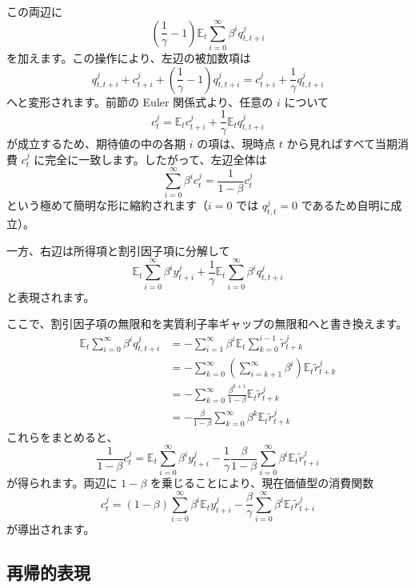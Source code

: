 \documentclass[
  japanese,
  lualatex,
  ja=standard,
  12pt,
  a4paper]{ltjsarticle}
\begin{document}

この両辺に \[
\left( \frac{1}{\gamma} - 1 \right) \mathbb{E}_t \sum_{i=0}^{\infty} \beta^i q_{t,t+i}^j
\] を加えます。この操作により、左辺の被加数項は \[
q_{t,t+i}^j + c_{t+i}^j + \left( \frac{1}{\gamma} - 1 \right) q_{t,t+i}^j = c_{t+i}^j + \frac{1}{\gamma} q_{t,t+i}^j
\] へと変形されます。前節の Euler 関係式より、任意の \(i\) について \[
c_t^j = \mathbb{E}_t c_{t+i}^j + \frac{1}{\gamma} \mathbb{E}_t q_{t,t+i}^j
\] が成立するため、期待値の中の各期 \(i\) の項は、現時点 \(t\)
から見ればすべて当期消費 \(c_t^j\)
に完全に一致します。したがって、左辺全体は \[
\sum_{i=0}^{\infty} \beta^i c_t^j = \frac{1}{1-\beta} c_t^j
\] という極めて簡明な形に縮約されます（\(i=0\) では \(q_{t,t}^j=0\)
であるため自明に成立）。

一方、右辺は所得項と割引因子項に分解して \[
\mathbb{E}_t \sum_{i=0}^{\infty} \beta^i y_{t+i}^j
+
\frac{1}{\gamma} \mathbb{E}_t \sum_{i=0}^{\infty} \beta^i q_{t,t+i}^j
\] と表現されます。

ここで、割引因子項の無限和を実質利子率ギャップの無限和へと書き換えます。
\[
\begin{aligned}
\mathbb{E}_t \sum_{i=0}^{\infty} \beta^i q_{t,t+i}^j
&=
- \sum_{i=1}^{\infty} \beta^i \mathbb{E}_t \sum_{k=0}^{i-1} \widetilde{r}_{t+k}^j
\\
&=
- \sum_{k=0}^{\infty} \left( \sum_{i=k+1}^{\infty} \beta^i \right) \mathbb{E}_t \widetilde{r}_{t+k}^j
\\
&=
- \sum_{k=0}^{\infty} \frac{\beta^{k+1}}{1-\beta} \mathbb{E}_t \widetilde{r}_{t+k}^j
\\
&=
- \frac{\beta}{1-\beta} \sum_{k=0}^{\infty} \beta^k \mathbb{E}_t \widetilde{r}_{t+k}^j
\end{aligned}
\] これらをまとめると、 \[
\frac{1}{1-\beta} c_t^j
=
\mathbb{E}_t \sum_{i=0}^{\infty} \beta^i y_{t+i}^j
-
\frac{1}{\gamma} \frac{\beta}{1-\beta} \sum_{i=0}^{\infty} \beta^i \mathbb{E}_t \widetilde{r}_{t+i}^j
\] が得られます。両辺に \(1-\beta\)
を乗じることにより、現在価値型の消費関数 \[
c_t^j
=
(1-\beta) \sum_{i=0}^{\infty} \beta^i \mathbb{E}_t y_{t+i}^j
-
\frac{\beta}{\gamma} \sum_{i=0}^{\infty} \beta^i \mathbb{E}_t \widetilde{r}_{t+i}^j
\] が導出されます。


\subsection{再帰的表現}\label{ux518dux5e30ux7684ux8868ux73fe}
\end{document}

